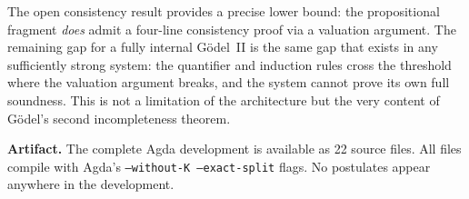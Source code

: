 \documentclass[11pt]{article}
\begin{document}
The open consistency result provides a precise lower bound: the
propositional fragment \emph{does} admit a four-line consistency proof
via a valuation argument. The remaining gap for a fully internal
G\"odel~II is the same gap that exists in any sufficiently strong
system: the quantifier and induction rules cross the threshold where
the valuation argument breaks, and the system cannot prove its own
full soundness. This is not a limitation of the architecture but the
very content of G\"odel's second incompleteness theorem.

\bigskip

\noindent\textbf{Artifact.}
The complete Agda development is available as 22 source files. All files
compile with Agda's \texttt{--without-K --exact-split} flags. No postulates
appear anywhere in the development.
\end{document}
